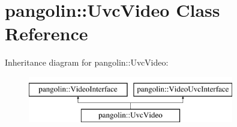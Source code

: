 \hypertarget{classpangolin_1_1_uvc_video}{}\section{pangolin\+:\+:Uvc\+Video Class Reference}
\label{classpangolin_1_1_uvc_video}
Inheritance diagram for pangolin\+:\+:Uvc\+Video\+:\begin{figure}[H]
\begin{center}
\leavevmode
\includegraphics[height=2.000000cm]{classpangolin_1_1_uvc_video}
\end{center}
\end{figure}
